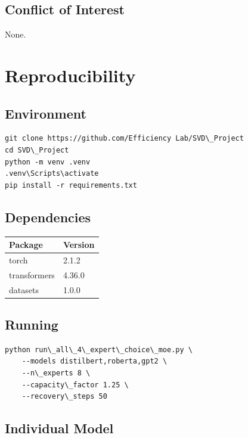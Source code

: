 \subsection{Conflict of Interest}

None.



\section{Reproducibility}

\subsection{Environment}

\begin{lstlisting}
git clone https://github.com/Efficiency Lab/SVD\_Project
cd SVD\_Project
python -m venv .venv
.venv\Scripts\activate
pip install -r requirements.txt
\end{lstlisting}

\subsection{Dependencies}

\begin{table}[H]
\centering
\small
\begin{tabular}{ll}
\toprule
\textbf{Package} & \textbf{Version} \\
\midrule
torch & 2.1.2 \\
transformers & 4.36.0 \\
datasets & 1.0.0 \\
\bottomrule
\end{tabular}
\end{table}

\subsection{Running}

\begin{lstlisting}
python run\_all\_4\_expert\_choice\_moe.py \
    --models distilbert,roberta,gpt2 \
    --n\_experts 8 \
    --capacity\_factor 1.25 \
    --recovery\_steps 50
\end{lstlisting}

\subsection{Individual Model}

